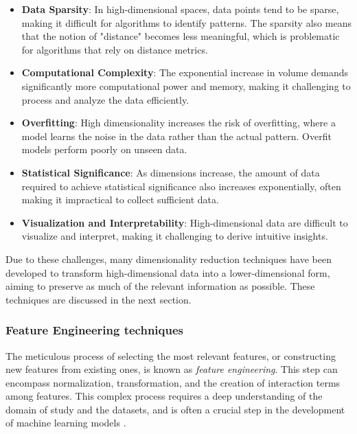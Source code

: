     \begin{itemize}
        \item \textbf{Data Sparsity}: In high-dimensional spaces, data points tend to be sparse, making it difficult for algorithms to identify patterns. The sparsity also means that the notion of "distance" becomes less meaningful, which is problematic for algorithms that rely on distance metrics.
        
        \item \textbf{Computational Complexity}: The exponential increase in volume demands significantly more computational power and memory, making it challenging to process and analyze the data efficiently.
        
        \item \textbf{Overfitting}: High dimensionality increases the risk of overfitting, where a model learns the noise in the data rather than the actual pattern. Overfit models perform poorly on unseen data.
        
        \item \textbf{Statistical Significance}: As dimensions increase, the amount of data required to achieve statistical significance also increases exponentially, often making it impractical to collect sufficient data.
        
        \item \textbf{Visualization and Interpretability}: High-dimensional data are difficult to visualize and interpret, making it challenging to derive intuitive insights.
    \end{itemize}

    Due to these challenges, many dimensionality reduction techniques have been developed to transform high-dimensional data into a lower-dimensional form, aiming to preserve as much of the relevant information as possible. These techniques are discussed in the next section.

    \subsubsection{Feature Engineering techniques}
    The meticulous process of selecting the most relevant features, or constructing new features from existing ones, is known as \textit{feature engineering}. This step can encompass normalization, transformation, and the creation of interaction terms among features. This complex process requires a deep understanding of the domain of study and the datasets, and is often a crucial step in the development of machine learning models \cite{FeatureEngineeringMadeEasy18}.


